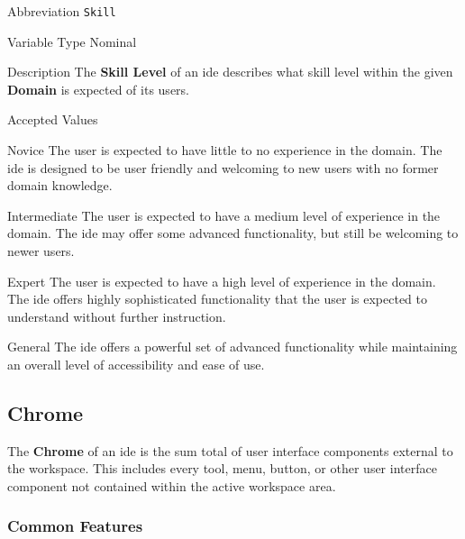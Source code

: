 \begin{AlignedDesc}
  \item[Abbreviation] \texttt{Skill}

  \item[Variable Type] Nominal

  \item[Description] The \textbf{Skill Level} of an \ac{ide} describes what
  skill level within the given \textbf{Domain} is expected of its users.

  \item[Accepted Values]

  \begin{AlignedDesc}
    \item[Novice] The user is expected to have little to no experience in
    the domain. The \ac{ide} is designed to be user friendly and welcoming
    to new users with no former domain knowledge.
    \item[Intermediate] The user is expected to have a medium level of
    experience in the domain. The \ac{ide} may offer some advanced
    functionality, but still be welcoming to newer users.
    \item[Expert] The user is expected to have a high level of experience
    in the domain. The \ac{ide} offers highly sophisticated functionality
    that the user is expected to understand without further instruction.
    \item[General] The \ac{ide} offers a powerful set of advanced
    functionality while maintaining an overall level of accessibility and
    ease of use.
  \end{AlignedDesc}

\end{AlignedDesc}


\subsection{Chrome}
\label{sec:chrome}

The \textbf{Chrome} of an \ac{ide} is the sum total of user interface
components external to the workspace. This includes every tool, menu,
button, or other user interface component not contained within the active
workspace area.

\subsubsection{Common Features}
\label{subsec:features}

